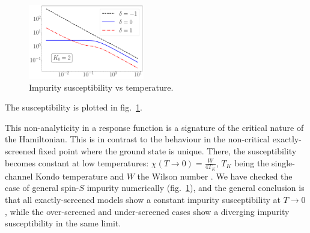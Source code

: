 \documentclass[reprint,prb,superscriptaddress]{revtex4-2}
\begin{document}
\begin{figure}[!htpb]
\centering
\includegraphics[width=0.45\textwidth]{plt/Central_Field_Chi_Powerlaw_.pdf}
\caption{Impurity susceptibility vs temperature.}
\label{fig:suseptibility_impurity}
\end{figure}
The susceptibility is plotted in fig.~\ref{fig:suseptibility_impurity}.

This non-analyticity in a response function is a signature of the critical nature of the Hamiltonian. This is in contrast to the behaviour in the non-critical exactly-screened fixed point where the ground state is unique. There, the susceptibility becomes constant at low temperatures: \(\chi(T\to 0) = \frac{W}{4 T_K}\), \(T_K\) being the single-channel Kondo temperature and \(W\) the Wilson number \cite{wilson1975renormalization,nozieres1974fermi,bullaNRGreview,kondo_urg}. We have checked the case of general spin-\(S\) impurity numerically (fig.~\ref{fig:suseptibility_impurity}), and the general conclusion is that all exactly-screened models show a constant impurity susceptibility at \(T \to 0\), while the over-screened and under-screened cases show a diverging impurity susceptibility in the same limit. 
\end{document}
